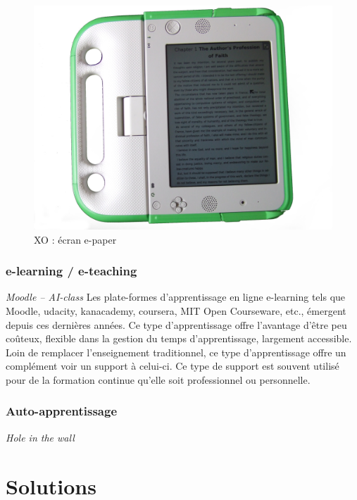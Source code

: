 \begin{minipage}{.5\linewidth}
  \begin{figure}[H]
    \includegraphics[width=\linewidth]{../resources/illustrations/olpc_display}
    \caption{XO : écran e-paper}
  \end{figure}
\end{minipage}



\subsubsection{e-learning / e-teaching}
\textit{Moodle -- AI-class}
Les plate-formes d'apprentissage en ligne \og{}e-learning\fg{} tels
que Moodle, udacity, kanacademy, coursera, MIT Open Courseware, etc.,
émergent depuis ces dernières années. Ce type d'apprentissage offre l'avantage d'être peu
coûteux, flexible dans la gestion du temps d'apprentissage, largement
accessible. Loin de remplacer l'enseignement traditionnel, ce type
d'apprentissage offre un complément voir un support à celui-ci. Ce
type de support est souvent utilisé pour de la formation continue
qu'elle soit professionnel ou personnelle.

\subsubsection{Auto-apprentissage}
\textit{Hole in the wall}

\section{Solutions}
\label{sec:solutions}

